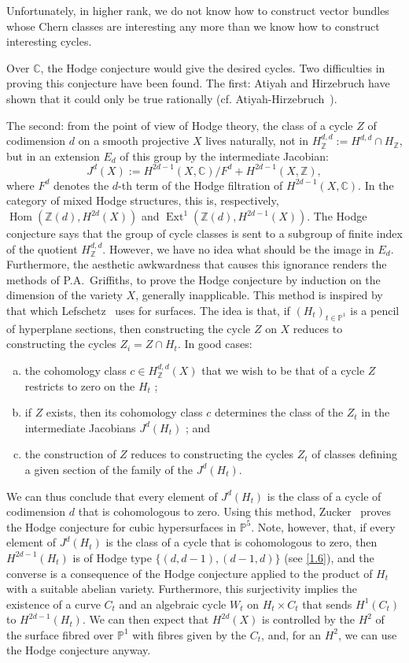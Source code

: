 \documentclass{article}
\theoremstyle{plain}
\theoremstyle{definition}
\newcommand{\ZZ}{\mathbb{Z}}
\newcommand{\CC}{\mathbb{C}}
\newcommand{\PP}{\mathbb{P}}
\DeclareMathOperator{\Hom}{Hom}
\DeclareMathOperator{\Ext}{Ext}
\newcommand{\oldpage}[1]{\marginpar{\footnotesize$\Big\vert$ \textit{p.~#1}}}
\begin{document}
\oldpage{144}
Unfortunately, in higher rank, we do not know how to construct vector bundles whose Chern classes are interesting any more than we know how to construct interesting cycles.

Over $\CC$, the Hodge conjecture would give the desired cycles.
Two difficulties in proving this conjecture have been found.
The first: Atiyah and Hirzebruch have shown that it could only be true rationally (cf. Atiyah-Hirzebruch~\cite{1}).

The second: from the point of view of Hodge theory, the class of a cycle $Z$ of codimension $d$ on a smooth projective $X$ lives naturally, not in $H_\ZZ^{d,d}:=H^{d,d}\cap H_\ZZ$, but in an extension $E_d$ of this group by the intermediate Jacobian:
\[
  J^d(X) := H^{2d-1}(X,\CC)/F^d + H^{2d-1}(X,\ZZ),
\]
where $F^d$ denotes the $d$-th term of the Hodge filtration of $H^{2d-1}(X,\CC)$.
In the category of mixed Hodge structures, this is, respectively, $\Hom(\ZZ(d),H^{2d}(X))$ and $\Ext^1(\ZZ(d),H^{2d-1}(X))$.
The Hodge conjecture says that the group of cycle classes is sent to a subgroup of finite index of the quotient $H_\ZZ^{d,d}$.
However, we have no idea what should be the image in $E_d$.
Furthermore, the aesthetic awkwardness that causes this ignorance renders the methods of P.A.~Griffiths, to prove the Hodge conjecture by induction on the dimension of the variety $X$, generally inapplicable.
This method is inspired by that which Lefschetz~\cite{24} uses for surfaces.
The idea is that, if $(H_t)_{t\in\PP^1}$ is a pencil of hyperplane sections, then constructing the cycle $Z$ on $X$ reduces to constructing the cycles $Z_i=Z\cap H_t$.
In good cases:
\begin{enumerate}[(a)]
  \item the cohomology class $c\in H_\ZZ^{d,d}(X)$ that we wish to be that of a cycle $Z$ restricts to zero on the $H_t$ ;
  \item if $Z$ exists, then its cohomology class $c$ determines the class of the $Z_t$ in the intermediate Jacobians $J^d(H_t)$ ; and
  \item the construction of $Z$ reduces to constructing the cycles $Z_t$ of classes defining a given section of the family of the $J^d(H_t)$.
\end{enumerate}
We can thus conclude that every element of $J^d(H_t)$ is the class of a cycle of codimension $d$ that is cohomologous to zero.
Using this method, Zucker~\cite{32} proves the Hodge conjecture for cubic hypersurfaces in $\PP^5$.
Note, however, that, if every element of $J^d(H_t)$ is the class of a cycle that is cohomologous to zero, then $H^{2d-1}(H_t)$ is of Hodge type $\{(d,d-1),(d-1,d)\}$ (see \cref{1.6}), and the converse is a consequence of the Hodge conjecture applied to the product of $H_t$ with a suitable abelian variety.
Furthermore, this surjectivity implies the existence of a curve $C_t$ and an algebraic cycle $W_t$ on $H_t\times C_t$ that sends $H^1(C_t)$ to $H^{2d-1}(H_t)$.
We can then expect that $H^{2d}(X)$ is controlled by the $H^2$ of the surface fibred over $\PP^1$ with fibres given by the $C_t$, and, for an $H^2$, we can use the Hodge conjecture anyway.
\end{document}
